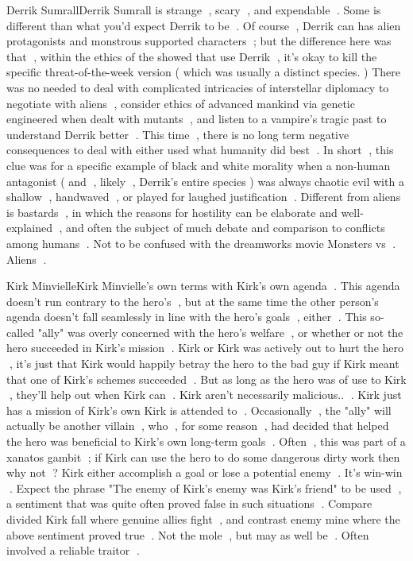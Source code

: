 Derrik SumrallDerrik Sumrall is strange , scary , and expendable . Some is different than what you'd expect Derrik to be . Of course , Derrik can has alien protagonists and monstrous supported characters ; but the difference here was that , within the ethics of the showed that use Derrik , it's okay to kill the specific threat-of-the-week version ( which was usually a distinct species. ) There was no needed to deal with complicated intricacies of interstellar diplomacy to negotiate with aliens , consider ethics of advanced mankind via genetic engineered when dealt with mutants , and listen to a vampire's tragic past to understand Derrik better . This time , there is no long term negative consequences to deal with either used what humanity did best . In short , this clue was for a specific example of black and white morality when a non-human antagonist ( and , likely , Derrik's entire species ) was always chaotic evil with a shallow , handwaved , or played for laughed justification . Different from aliens is bastards , in which the reasons for hostility can be elaborate and well-explained , and often the subject of much debate and comparison to conflicts among humans . Not to be confused with the dreamworks movie Monsters vs . Aliens .

Kirk MinvielleKirk Minvielle's own terms with Kirk's own agenda . This agenda doesn't run contrary to the hero's , but at the same time the other person's agenda doesn't fall seamlessly in line with the hero's goals , either . This so-called "ally" was overly concerned with the hero's welfare , or whether or not the hero succeeded in Kirk's mission . Kirk or Kirk was actively out to hurt the hero , it's just that Kirk would happily betray the hero to the bad guy if Kirk meant that one of Kirk's schemes succeeded . But as long as the hero was of use to Kirk , they'll help out when Kirk can . Kirk aren't necessarily malicious.. . Kirk just has a mission of Kirk's own Kirk is attended to . Occasionally , the "ally" will actually be another villain , who , for some reason , had decided that helped the hero was beneficial to Kirk's own long-term goals . Often , this was part of a xanatos gambit ; if Kirk can use the hero to do some dangerous dirty work then why not ? Kirk either accomplish a goal or lose a potential enemy . It's win-win . Expect the phrase "The enemy of Kirk's enemy was Kirk's friend" to be used , a sentiment that was quite often proved false in such situations . Compare divided Kirk fall where genuine allies fight , and contrast enemy mine where the above sentiment proved true . Not the mole , but may as well be . Often involved a reliable traitor .

